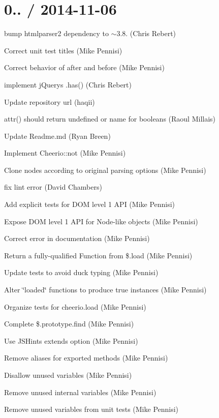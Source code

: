 \section*{0.. / 2014-\/11-\/06 }


\begin{DoxyItemize}
\item bump htmlparser2 dependency to $\sim$3.8. (Chris Rebert)
\item Correct unit test titles (Mike Pennisi)
\item Correct behavior of {\ttfamily after} and {\ttfamily before} (Mike Pennisi)
\item implement j\+Query\textquotesingle{}s .has() (Chris Rebert)
\item Update repository url (haqii)
\item attr() should return undefined or name for booleans (Raoul Millais)
\item Update Readme.\+md (Ryan Breen)
\item Implement {\ttfamily Cheerio\+::not} (Mike Pennisi)
\item Clone nodes according to original parsing options (Mike Pennisi)
\item fix lint error (David Chambers)
\item Add explicit tests for D\+OM level 1 A\+PI (Mike Pennisi)
\item Expose D\+OM level 1 A\+PI for Node-\/like objects (Mike Pennisi)
\item Correct error in documentation (Mike Pennisi)
\item Return a fully-\/qualified Function from {\ttfamily \$.load} (Mike Pennisi)
\item Update tests to avoid duck typing (Mike Pennisi)
\item Alter \char`\"{}loaded\char`\"{} functions to produce true instances (Mike Pennisi)
\item Organize tests for {\ttfamily cheerio.\+load} (Mike Pennisi)
\item Complete {\ttfamily \$.prototype.\+find} (Mike Pennisi)
\item Use J\+S\+Hint\textquotesingle{}s {\ttfamily extends} option (Mike Pennisi)
\item Remove aliases for exported methods (Mike Pennisi)
\item Disallow unused variables (Mike Pennisi)
\item Remove unused internal variables (Mike Pennisi)
\item Remove unused variables from unit tests (Mike Pennisi)

\end{DoxyItemize}
